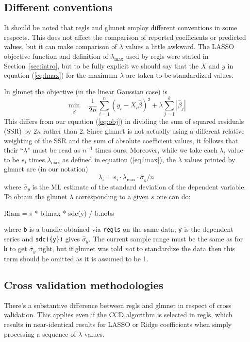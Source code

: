 \documentclass{article}
\begin{document}
\subsection{Different conventions}

It should be noted that \textsf{regls} and \textsf{glmnet} employ
different conventions in some respects. This does not affect the
comparison of reported coefficients or predicted values, but it can
make comparison of $\lambda$ values a little awkward. The LASSO
objective function and definition of $\lambda_{\max}$ used by
\textsf{regls} were stated in Section~\ref{sec:intro}, but to be fully
explicit we should say that the $X$ and $y$ in equation
(\ref{eq:lmax}) for the maximum $\lambda$ are taken to be standardized
values.

In \textsf{glmnet} the objective (in the linear Gaussian case) is
\[
   \min_{\hat{\beta}} \quad \frac{1}{2n}\,
  \sum_{i=1}^n (y_i - X_i\hat{\beta})^2 + \lambda \sum_{j=1}^k |\hat{\beta}_j|
\]
This differs from our equation (\ref{eq:obj}) in dividing the sum of
squared residuals (SSR) by $2n$ rather than 2. Since \textsf{glmnet}
is not actually using a different relative weighting of the SSR and
the sum of absolute coefficient values, it follows that their
``$\lambda$'' must be read as $n^{-1}$ times ours. Moreover, while we
take each $\lambda_i$ value to be $s_i$ times $\lambda_{\max}$ as
defined in equation (\ref{eq:lmax}), the $\lambda$ values printed by
\textsf{glmnet} are (in our notation)
\[
\lambda_i = s_i \cdot \lambda_{\max} \cdot \hat{\sigma}_y / n
\]
where $\hat{\sigma}_y$ is the ML estimate of the standard deviation of
the dependent variable. To obtain the \textsf{glmnet} $\lambda$
corresponding to a given $s$ one can do:
\begin{code}
Rlam = s * b.lmax * sdc({y}) / b.nobs
\end{code}
where \texttt{b} is a bundle obtained via \texttt{regls} on the same
data, \texttt{y} is the dependent series and \texttt{sdc(\{y\})} gives
$\hat{\sigma}_y$. The current sample range must be the same as for
\texttt{b} to get $\hat{\sigma}_y$ right, but if \textsf{glmnet} was
told \textit{not} to standardize the data then this term should be
omitted as it is assumed to be 1.

\subsection{Cross validation methodologies}

There's a substantive difference between \textsf{regls} and
\textsf{glmnet} in respect of cross validation. This applies even if
the CCD algorithm is selected in \textsf{regls}, which results in
near-identical results for LASSO or Ridge coefficients when simply
processing a sequence of $\lambda$ values.
\end{document}
